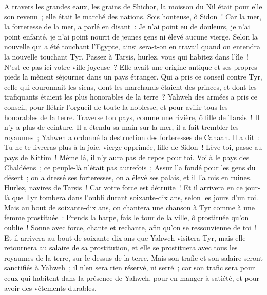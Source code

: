 \begin{multicols}{2}
A travers les grandes eaux, les grains de Shichor, la moisson du Nil était pour elle son revenu~; elle était le marché des nations.
Sois honteuse, ô Sidon~! Car la mer, la forteresse de la mer, a parlé en disant~: Je n'ai point eu de douleurs, je n'ai point enfanté, je n'ai point nourri de jeunes gens ni élevé aucune vierge.
Selon la nouvelle qui a été touchant l'Egypte, ainsi sera-t-on en travail quand on entendra la nouvelle touchant Tyr.
Passez à Tarsis, hurlez, vous qui habitez dans l'île~!
N'est-ce pas ici votre ville joyeuse~? Elle avait une origine antique et ses propres pieds la mènent séjourner dans un pays étranger.
Qui a pris ce conseil contre Tyr, celle qui couronnait les siens, dont les marchands étaient des princes, et dont les trafiquants étaient les plus honorables de la terre~?
Yahweh des armées a pris ce conseil, pour flétrir l'orgueil de toute la noblesse, et pour avilir tous les honorables de la terre.
Traverse ton pays, comme une rivière, ô fille de Tarsis~! Il n'y a plus de ceinture.
Il a étendu sa main sur la mer, il a fait trembler les royaumes~; Yahweh a ordonné la destruction des forteresses de Canaan.
Il a dit~: Tu ne te livreras plus à la joie, vierge opprimée, fille de Sidon~! Lève-toi, passe au pays de Kittim~! Même là, il n'y aura pas de repos pour toi.
Voilà le pays des Chaldéens~; ce peuple-là n'était pas autrefois~; Assur l'a fondé pour les gens du désert~; on a dressé ses forteresses, on a élevé ses palais, et il l'a mis en ruines.
Hurlez, navires de Tarsis~! Car votre force est détruite~!
Et il arrivera en ce jour-là que Tyr tombera dans l'oubli durant soixante-dix ans, selon les jours d'un roi. Mais au bout de soixante-dix ans, on chantera une chanson à Tyr comme à une femme prostituée~:
Prends la harpe, fais le tour de la ville, ô prostituée qu'on oublie~! Sonne avec force, chante et rechante, afin qu'on se ressouvienne de toi~!
Et il arrivera au bout de soixante-dix ans que Yahweh visitera Tyr, mais elle retournera au salaire de sa prostitution, et elle se prostituera avec tous les royaumes de la terre, sur le dessus de la terre.
Mais son trafic et son salaire seront sanctifiés à Yahweh~; il n'en sera rien réservé, ni serré~; car son trafic sera pour ceux qui habitent dans la présence de Yahweh, pour en manger à satiété, et pour avoir des vêtements durables.

\end{multicols}
